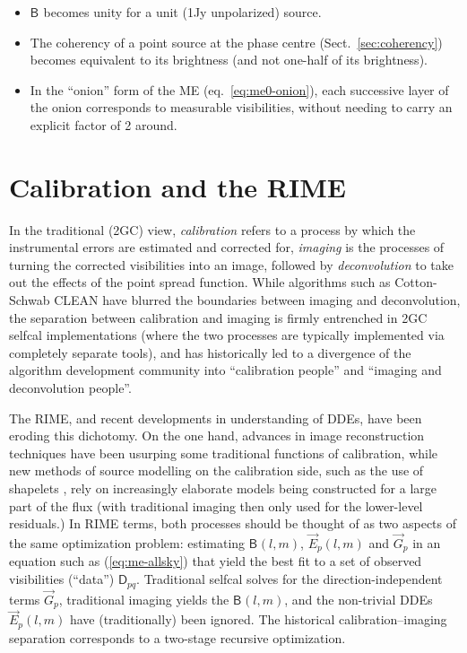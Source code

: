 \documentclass[]{aa}
\newcommand{\jones}[2]{\vec {#1}_{#2}}
\newcommand{\coh}[2]{\mathsf{{#1}}_{{#2}}}
\begin{document}
\begin{itemize}
\item $\coh{B}{}$ becomes unity for a unit (1Jy unpolarized) source.
\item The coherency of a point source at the phase centre (Sect.~\ref{sec:coherency}) becomes equivalent to its brightness (and not one-half of its brightness).
\item In the ``onion'' form of the ME (eq.~\ref{eq:me0-onion}), each successive layer of the onion corresponds to measurable visibilities, without needing to carry an explicit factor of 2 around.
\end{itemize}

\section{\label{sec:calibration}Calibration and the RIME}

In the traditional (2GC) view, \emph{calibration} refers to a process by which the instrumental errors are estimated and corrected for, \emph{imaging} is the processes of turning the corrected visibilities into an image, followed by \emph{deconvolution} to take out the effects of the point spread function. While algorithms such as Cotton-Schwab CLEAN \citep{Schwab:csclean} have blurred the boundaries between imaging and deconvolution, the separation between calibration and imaging is firmly entrenched in 2GC selfcal implementations (where the two processes are typically implemented via completely separate tools), and has historically led to a divergence of the algorithm development community into ``calibration people'' and ``imaging and deconvolution people''. 

The RIME, and recent developments in understanding of DDEs, have been eroding this dichotomy. On the one hand, advances in image reconstruction techniques \citep[for an overview, see][]{Rau:DDEs} have been usurping some traditional functions of calibration, while new methods of source modelling on the calibration side, such as the use of shapelets \citep{Yatawatta:shapelets}, rely on increasingly elaborate models being constructed for a large part of the flux (with traditional imaging then only used for the lower-level residuals.) In RIME terms, both processes should be thought of as two aspects of the same optimization problem: estimating $\coh{B}{}(l,m)$, $\jones{E}{p}(l,m)$ and $\jones{G}{p}$ in an equation such as (\ref{eq:me-allsky}) that yield the best fit to a set of observed visibilities  (``data'') $\coh{D}{pq}$. Traditional selfcal solves for the direction-independent terms $\jones{G}{p}$, traditional imaging yields the $\coh{B}{}(l,m)$, and the non-trivial DDEs $\jones{E}{p}(l,m)$ have (traditionally) been ignored. The historical calibration--imaging separation corresponds to a two-stage recursive optimization. 
\end{document}
